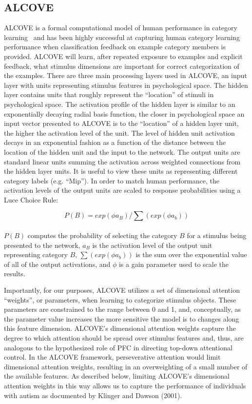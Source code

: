 \documentclass[man]{apa}
\begin{document}
\subsection{ALCOVE}
ALCOVE is a formal computational model of human performance in category learning~\cite{RefWorks:114} and has been highly successful at capturing human category learning performance when classification feedback on example category members is provided.  ALCOVE will learn, after repeated exposure to examples and explicit feedback, what stimulus dimensions are important for correct categorization of the examples.  There are three main processing layers used in ALCOVE, an input layer with units representing stimulus features in psychological space.  The hidden layer contains units that roughly represent the ``location'' of stimuli in psychological space.  The activation profile of the hidden layer is similar to an exponentially decaying radial basis function, the closer in psychological space an input vector presented to ALCOVE is to the ``location'' of a hidden layer unit, the higher the activation level of the unit.  The level of hidden unit activation decays in an exponential fashion as a function of the distance between the location of the hidden unit and the input to the network.  The output units are standard linear units summing the activation across weighted connections from the hidden layer units.  It is useful to view these units as representing different category labels (e.g. ``Mip''). In order to match human performance, the activation levels of the output units are scaled to response probabilities using a Luce Choice Rule:

\begin{equation}
P(B) = exp(\phi a_B) / \sum (exp(\phi a_b))
\label{luce-choice}
\end{equation}\\
$P(B)$ computes the probability of selecting the category $B$ for a stimulus being presented to the network, $a_B$ is the activation level of the output unit representing category $B$, $\sum (exp(\phi a_b))$ is the sum over the exponential value of all of the output activations, and  $\phi$ is a gain parameter used to scale the results.

Importantly, for our purposes, ALCOVE utilizes a set of dimensional attention ``weights'', or parameters, when learning to categorize stimulus objects.  These parameters are constrained to the range between 0 and 1, and, conceptually, as the parameter value increases the more sensitive the model is to changes along this feature dimension.  ALCOVE's dimensional attention weights capture the degree to which attention should be spread over stimulus features and, thus, are analogous to the hypothesized role of PFC in directing top-down attentional control.  In the ALCOVE framework, perseverative attention would limit dimensional attention weights, resulting in an overweighting of a small number of the available features.  As described below, limiting ALCOVE's dimensional attention weights in this way allows us to capture the performance of individuals with autism as documented by Klinger and Dawson (2001). 
\end{document}
